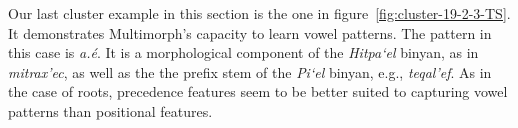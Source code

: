 Our last cluster example in this section is the one in figure~\ref{fig:cluster-19-2-3-TS}. It demonstrates 
Multimorph's capacity to learn vowel patterns. The pattern in this case is \textit{a.\'{e}}.
 It is a morphological component of the \textit{Hitpa`el} binyan, 
as in \textit{mitrax\a'{e}c}, as well as the 
the prefix stem of the \textit{Pi`el} binyan,
e.g., \textit{teqal\a'{e}f}.
As in the case of roots, precedence features seem to be better suited to capturing vowel patterns than positional features.



% 

